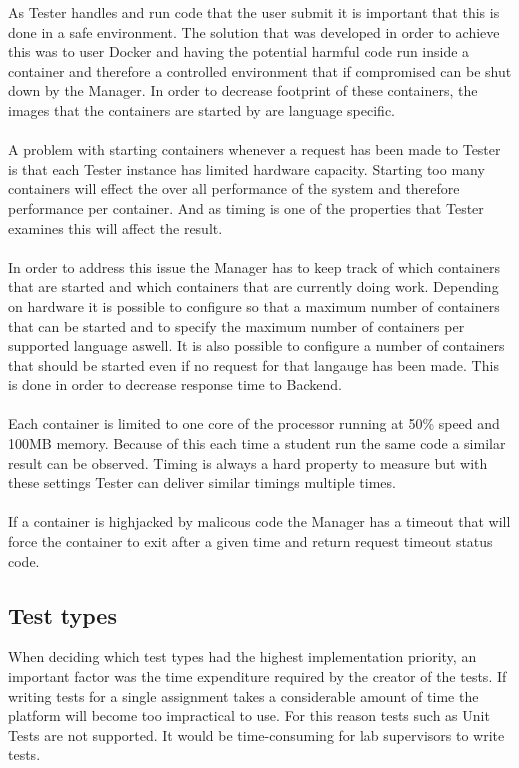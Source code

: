 As Tester handles and run code that the user submit it is important that this is
done in a safe environment. The solution that was developed in order to achieve
this was to user Docker and having the potential harmful code run inside a container
and therefore a controlled environment that if compromised can be shut down by the
Manager. In order to decrease footprint of these containers, the images that the
containers are started by are language specific.\\
\\
A problem with starting containers whenever a request has been made to Tester
is that each Tester instance has limited hardware capacity. Starting too many
containers will effect the over all performance of the system and therefore
performance per container. And as timing is one of the properties that Tester
examines this will affect the result.\\
\\
In order to address this issue the Manager has to keep track of which containers
that are started and which containers that are currently doing work. Depending on
hardware it is possible to configure so that a maximum number of containers that
can be started and to specify the maximum number of containers
per supported language aswell. It is also possible to configure a number of containers
that should be started even if no request for that langauge has been made. This
is done in order to decrease response time to Backend.\\
\\
Each container is limited to one core of the processor running at 50\% speed and
100MB memory. Because of this each time a student run the same code a similar
result can be observed. Timing is always a hard property to measure but with
these settings Tester can deliver similar timings multiple times.\\
\\
If a container is highjacked by malicous code the Manager has a timeout that will
force the container to exit after a given time and return request timeout status code.

\subsection{Test types}
When deciding which test types had the highest implementation priority, an important factor was the time expenditure required by the creator of the tests. If writing tests for a single assignment takes a considerable amount of time the platform will become too impractical to use. For this reason tests such as Unit Tests are not supported. It would be time-consuming for lab supervisors to write tests. %

